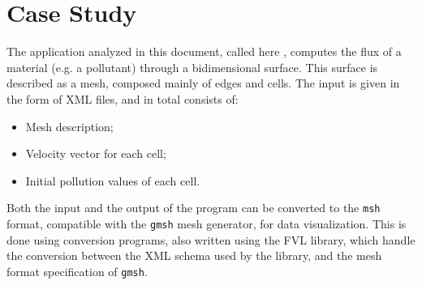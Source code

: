 \section{Case Study}

The application analyzed in this document, called here \polu, computes the flux of a material (e.g. a pollutant) through a bidimensional surface. This surface is described as a mesh, composed mainly of edges and cells. The input is given in the form of XML files, and in total consists of:

\begin{itemize}
	\item Mesh description;
	\item Velocity vector for each cell;
	\item Initial pollution values of each cell.
\end{itemize}

Both the input and the output of the program can be converted to the \texttt{msh} format, compatible with the \texttt{gmsh} mesh generator, for data visualization. This is done using conversion programs, also written using the FVL library, which handle the conversion between the XML schema used by the library, and the mesh format specification of \texttt{gmsh}\cite{gmsh}.



